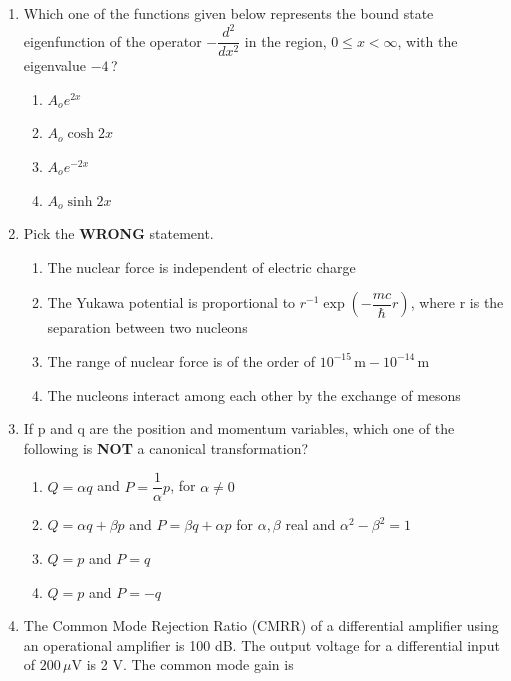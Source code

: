 \documentclass[14pt, a4paper]{extarticle}
\begin{document}
\begin{enumerate}[label=\textbf{Q. \arabic*}]
\item Which one of the functions given below represents the bound state eigenfunction of the operator $-\dfrac{d^2}{dx^2}$ in the region, $0 \le x < \infty$, with the eigenvalue $-4$\,?
    \begin{multicols}{2}
    \begin{enumerate}
        \item $A_o e^{2x}$
        \item $A_o \cosh 2x$
        \item $A_o e^{-2x}$
        \item $A_o \sinh 2x$
    \end{enumerate}
    \end{multicols}

\item Pick the \textbf{WRONG} statement.
    \begin{enumerate}
        \item The nuclear force is independent of electric charge
        \item The Yukawa potential is proportional to $r^{-1} \exp\left(-\dfrac{mc}{\hbar} r\right)$, where r is the separation between two nucleons
        \item The range of nuclear force is of the order of $10^{-15}\,\mathrm{m} - 10^{-14}\,\mathrm{m}$
        \item The nucleons interact among each other by the exchange of mesons
    \end{enumerate}

\item If p and q are the position and momentum variables, which one of the following is \textbf{NOT} a canonical transformation?
    \begin{enumerate}
        \item $Q = \alpha q$ and $P = \dfrac{1}{\alpha}p$, for $\alpha \neq 0$
        \item $Q = \alpha q + \beta p$ and $P = \beta q + \alpha p$ for $\alpha, \beta$ real and $\alpha^2 - \beta^2 = 1$
        \item $Q = p$ and $P = q$
        \item $Q = p$ and $P = -q$
    \end{enumerate}

\item The Common Mode Rejection Ratio (CMRR) of a differential amplifier using an operational amplifier is 100 dB.
The output voltage for a differential input of $200\,\mu\text{V}$ is 2 V. The common mode gain is
\begin{enumerate}
\end{enumerate}


\end{enumerate}
\end{document}
